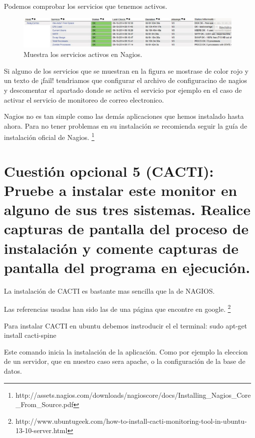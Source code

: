 Podemos comprobar los servicios que tenemos activos.

\begin{figure}[H]
\begin{center}
\includegraphics[scale=0.4]{imagenes/opcional2-8.eps}
\caption{Muestra los servicios activos en Nagios.}
\end{center}
\end{figure}

Si alguno de los servicios que se muestran en la figura se mostrase de color rojo y un texto de ¡fail! tendriamos que configurar el archivo de configuracino de nagios y descomentar el apartado donde se activa el servicio por ejemplo en el caso de activar el servicio de monitoreo de correo electronico.

Nagios no es tan simple como las demás aplicaciones que hemos instalado hasta ahora. Para no tener problemas en su instalación se recomienda seguir la guía de instalación oficial de Nagios. \footnote{http://assets.nagios.com/downloads/nagioscore/docs/Installing\_Nagios\_Core\_From\_Source.pdf}

\section*{ Cuestión opcional 5 (CACTI): Pruebe a instalar este monitor en alguno de sus tres sistemas. Realice capturas de pantalla del proceso de instalación y comente capturas de pantalla del programa en ejecución.}


La instalación de CACTI es bastante mas sencilla que la de NAGIOS.


Las referencias usadas han sido las de una página que encontre en google. \footnote{http://www.ubuntugeek.com/how-to-install-cacti-monitoring-tool-in-ubuntu-13-10-server.html}

Para instalar CACTI en ubuntu debemos instroducir el el terminal:
sudo apt-get install cacti-spine


Este comando inicia la instalación de la aplicación.
Como por ejemplo la eleccion de un servidor, que en nuestro caso sera apache, o la configuración de la base de datos.

